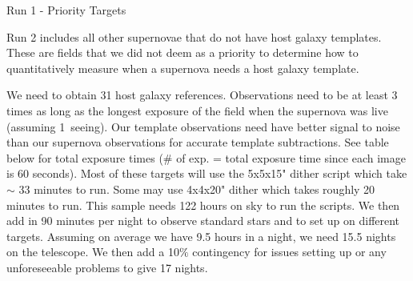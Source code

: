 \documentclass[11pt]{article}
\begin{document}
\begin{targettable}{Run 1 - Priority Targets}
\magnitude{} %

\magnitude{} %



\end{targettable}

\technicaldescription

Run 2 includes all other supernovae that do not have host galaxy templates. These are fields that we did not deem as a priority to determine how to quantitatively measure when a supernova needs a host galaxy template. 

We need to obtain 31 host galaxy references. 
Observations need to be at least 3 times as long as the longest exposure of the field when the supernova was live (assuming 1\arcsec\ seeing).
Our template observations need have better signal to noise than our supernova observations for accurate template subtractions. 
See table below for total exposure times ($\#$ of exp. = total exposure time since each image is 60 seconds).
Most of these targets will use the 5x5x15" dither script which take $\sim$ 33 minutes to run. Some may use 4x4x20" dither which takes roughly 20 minutes to run. 
This sample needs 122 hours on sky to run the scripts. 
We then add in 90 minutes per night to observe standard stars and to set up on different targets. 
Assuming on average we have 9.5 hours in a night, we need 15.5 nights on the telescope. 
We then add a 10$\%$ contingency for issues setting up or any unforeseeable problems to give 17 nights. 
\end{document}
